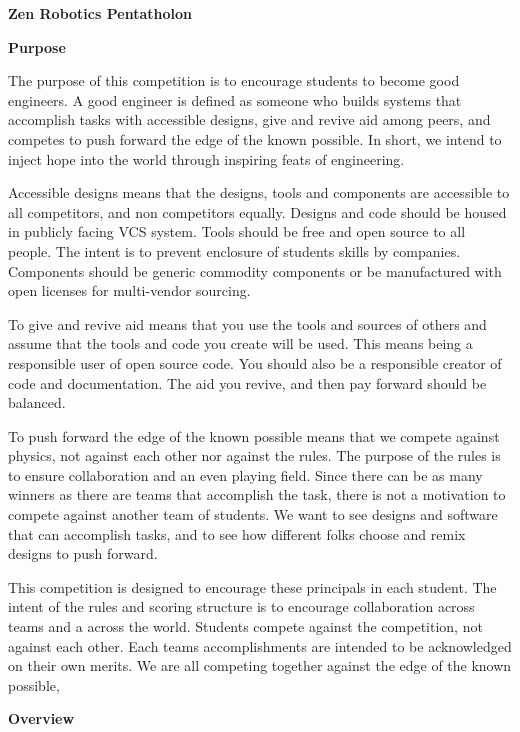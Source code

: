 \documentclass{article}
\begin{document}
	
{\huge \textbf{Zen Robotics Pentatholon}}

\vspace{1cm}

{\huge \textbf{Purpose}}
\vspace{1cm}

The purpose of this competition is to encourage students to become good engineers. A good engineer is defined as someone who builds systems that accomplish tasks with accessible designs, give and revive aid among peers, and competes to push forward the edge of the known possible. In short, we intend to inject hope into the world through inspiring feats of engineering.

Accessible designs means that the designs, tools and components are accessible to all competitors, and non competitors equally. Designs and code should be housed in publicly facing VCS system. Tools should be free and open source to all people. The intent is to prevent enclosure of students skills by companies.  Components should be generic commodity components or be manufactured with open licenses for multi-vendor sourcing.  

To give and revive aid means that you use the tools and sources of others and assume that the tools and code you create will be used. This means being a responsible user of open source code. You should also be a responsible creator of code and documentation. The aid you revive, and then pay forward should be  balanced. 

To push forward the edge of the known possible means that we compete against physics, not against each other nor against the rules. The purpose of the rules is to ensure collaboration and an even playing field. Since there can be as many winners as there are teams that accomplish the task, there is not a motivation to compete against another team of students. We want to see designs and software that can accomplish tasks, and to see how different folks choose and remix designs to push forward. 

  
This competition is designed to encourage these principals in each student. The intent of the rules and scoring structure is to encourage collaboration across teams and a across the world. Students compete against the competition, not against each other. Each teams accomplishments are intended to be acknowledged on their own merits. We are all competing together against the edge of the known possible, 
\pagebreak

{\huge \textbf{Overview}}
\vspace{1cm}
\end{document}
